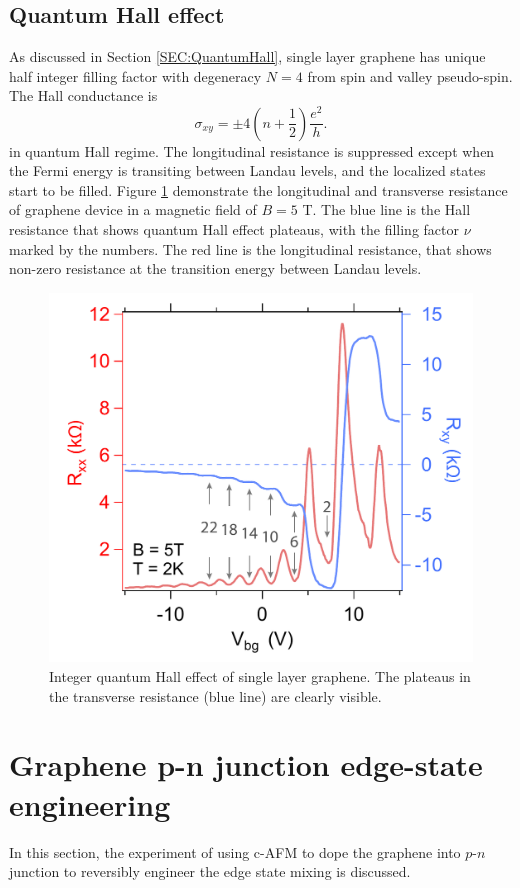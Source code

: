 \documentclass[pdflatex, sectionletters, 12pt]{pittetd}    %
\begin{document}
\subsection{Quantum Hall effect}

As discussed in Section \ref{SEC:QuantumHall}, single layer graphene has unique half integer filling factor with degeneracy $N = 4$ from spin and valley pseudo-spin. The Hall conductance is
$$
\sigma_{xy} = \pm 4\left(n + \frac{1}{2}\right)\frac{e^2}{h}.
$$
in quantum Hall regime. The longitudinal resistance is suppressed except when the Fermi energy is transiting between Landau levels, and the localized states start to be filled. Figure \ref{FIG:HallResistance} demonstrate the longitudinal and transverse resistance of graphene device in a magnetic field of $B = 5$ T. The blue line is the Hall resistance that shows quantum Hall effect plateaus, with the filling factor $\nu$ marked by the numbers. The red line is the longitudinal resistance, that shows non-zero resistance at the transition energy between Landau levels.
\\

\begin{figure}[h!]
	\centering
	\includegraphics[width=.55\textwidth]{Drawing/HallResistance.pdf}
	\caption{Integer quantum Hall effect of single layer graphene. The plateaus in the transverse resistance (blue line) are clearly visible.}
	\label{FIG:HallResistance}
\end{figure}

\section{Graphene p-n junction edge-state engineering}

In this section, the experiment of using c-AFM to dope the graphene into $p$-$n$ junction to reversibly engineer the edge state mixing is discussed.
\end{document}
